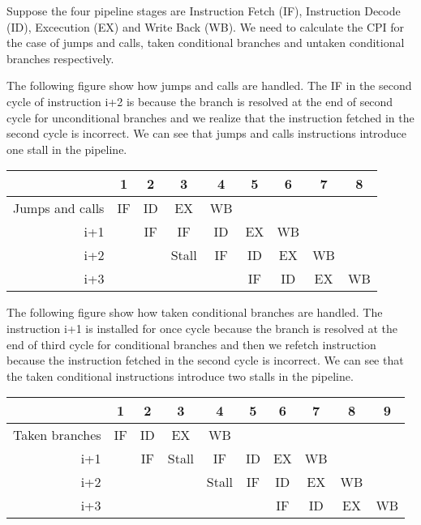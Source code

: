 \documentclass{article}
\begin{document}
Suppose the four pipeline stages are Instruction Fetch (IF), Instruction Decode (ID), Excecution (EX) and Write Back (WB). We need to calculate the CPI for the case of jumps and calls, taken conditional branches and untaken conditional branches respectively.

The following figure show how jumps and calls are handled. The IF in the second cycle of instruction i+2 is because the branch is resolved at the end of second cycle for unconditional branches and we realize that the instruction fetched in the second cycle is incorrect. We can see that jumps and calls instructions introduce one stall in the pipeline.

\begin{table}[ht!]
\begin{center}
\begin{tabular}{r|c|c|c|c|c|c|c|c} %
    \toprule
    &\textbf{1}&\textbf{2}&\textbf{3}&\textbf{4}&\textbf{5}&\textbf{6}&\textbf{7}&\textbf{8}\\
    \hline
    Jumps and calls&IF&ID&EX&WB&&&\\
    \hline
    i+1&&IF&IF&ID&EX&WB&\\
    \hline
    i+2&&&Stall&IF&ID&EX&WB&\\
    \hline
    i+3&&&&&IF&ID&EX&WB\\
    \bottomrule
    \end{tabular}
\end{center}
\end{table}

The following figure show how taken conditional branches are handled. The instruction i+1 is installed for once cycle because the branch is resolved at the end of third cycle for conditional branches and then we refetch instruction because the instruction fetched in the second cycle is incorrect. We can see that the taken conditional instructions introduce two stalls in the pipeline.

\begin{table}[ht!]
\begin{center}
\begin{tabular}{r|c|c|c|c|c|c|c|c|c} %
    \toprule
    &\textbf{1}&\textbf{2}&\textbf{3}&\textbf{4}&\textbf{5}&\textbf{6}&\textbf{7}&\textbf{8}&\textbf{9}\\
    \hline
    Taken branches&IF&ID&EX&WB&&&&\\
    \hline
    i+1&&IF&Stall&IF&ID&EX&WB&\\
    \hline
    i+2&&&&Stall&IF&ID&EX&WB\\
    \hline
    i+3&&&&&&IF&ID&EX&WB\\
    \bottomrule
    \end{tabular}
\end{center}
\end{table}
\end{document}
